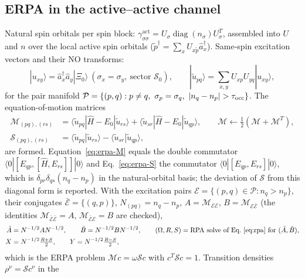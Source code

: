 \documentclass[11pt,a4paper]{article}
\newcommand{\ket}[1]{|#1\rangle}
\newcommand{\braket}[1]{\langle#1\rangle}
\newcommand{\act}{\mathrm{act}}
\begin{document}
\subsection{ERPA in the active--active channel}
\label{sec:erpa-impl}

Natural spin orbitals per spin block: $\gamma^{\act}_{\sigma\sigma}=U_\sigma\operatorname{diag}(n_\sigma)U_\sigma^{T}$,
assembled into $U$ and $n$ over the local active spin orbitals ($\tilde p^\dagger=\sum_xU_{x\tilde p}\hat a_x^\dagger$).
Same-spin excitation vectors and their NO transforms:
\begin{equation}
  \ket{u_{xy}}=\hat a_x^\dagger\hat a_y\ket{\Xi_0}\ (\sigma_x=\sigma_y,\ \text{sector }\mathcal S_0),\qquad
  \ket{\tilde u_{pq}}=\sum_{x,y}U_{xp}U_{yq}\ket{u_{xy}},
  \label{eq:erpa-u}
\end{equation}
for the pair manifold $\mathcal P=\{(p,q):p\ne q,\ \sigma_p=\sigma_q,\ |n_q-n_p|>\tau_{\rm occ}\}$.
The equation-of-motion matrices
\begin{align}
  \mathcal M_{(pq),(rs)}&=\braket{\tilde u_{pq}|\hat H-E_0|\tilde u_{rs}}+\braket{\tilde u_{sr}|\hat H-E_0|\tilde u_{qp}},
  \qquad\mathcal M\leftarrow\tfrac12(\mathcal M+\mathcal M^{T}),
  \label{eq:erpa-M}\\
  \mathcal S_{(pq),(rs)}&=\braket{\tilde u_{pq}|\tilde u_{rs}}-\braket{\tilde u_{sr}|\tilde u_{qp}},
  \label{eq:erpa-S}
\end{align}
are formed.  Equation~\eqref{eq:erpa-M} equals the double commutator
$\braket{0|[E_{qp},[\hat H,E_{rs}]]|0}$ and Eq.~\eqref{eq:erpa-S} the
commutator $\braket{0|[E_{qp},E_{rs}]|0}$, which is
$\delta_{pr}\delta_{qs}(n_q-n_p)$ in the natural-orbital basis; the
deviation of $\mathcal S$ from this diagonal form is reported.  With the excitation pairs $\mathcal E=\{(p,q)\in\mathcal P:n_q>n_p\}$,
their conjugates $\bar{\mathcal E}=\{(q,p)\}$, $N_{(pq)}=n_q-n_p$,
$A=\mathcal M_{\mathcal E\mathcal E}$, $B=\mathcal M_{\mathcal E\bar{\mathcal E}}$
(the identities $\mathcal M_{\bar{\mathcal E}\bar{\mathcal E}}=A$,
$\mathcal M_{\bar{\mathcal E}\mathcal E}=B$ are checked),
\begin{align}
  \tilde A&=N^{-1/2}AN^{-1/2},\qquad \tilde B=N^{-1/2}BN^{-1/2},\qquad
  (\Omega,R,S)=\text{RPA solve of Eq.~\eqref{eq:rpa} for }(\tilde A,\tilde B),
  \label{eq:erpa-solve}\\
  X&=N^{-1/2}\tfrac{R+S}{2},\qquad Y=N^{-1/2}\tfrac{R-S}{2},\nonumber
\end{align}
which is the ERPA problem $\mathcal Mc=\omega\mathcal Sc$ with
$c^{T}\mathcal Sc=1$.  Transition densities $\rho^\nu=\mathcal Sc^\nu$ in the
\end{document}
